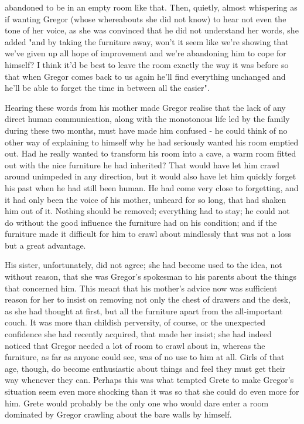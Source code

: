 \documentclass[12pt]{book}
\begin{document}
abandoned to be in an empty room like that. Then, quietly, almost whispering as if wanting Gregor (whose whereabouts she did not know) to hear not even the tone of her voice, as she was convinced that he did not understand her words, she added "and by taking the furniture away, won't it seem like we're showing that we've given up all hope of improvement and we're abandoning him to cope for himself? I think it'd be best to leave the room exactly the way it was before so that when Gregor comes back to us again he'll find everything unchanged and he'll be able to forget the time in between all the easier".

    Hearing these words from his mother made Gregor realise that the lack of any direct human communication, along with the monotonous life led by the family during these two months, must have made him confused - he could think of no other way of explaining to himself why he had seriously wanted his room emptied out. Had he really wanted to transform his room into a cave, a warm room fitted out with the nice furniture he had inherited? That would have let him crawl around unimpeded in any direction, but it would also have let him quickly forget his past when he had still been human. He had come very close to forgetting, and it had only been the voice of his mother, unheard for so long, that had shaken him out of it. Nothing should be removed; everything had to stay; he could not do without the good influence the furniture had on his condition; and if the furniture made it difficult for him to crawl about mindlessly that was not a loss but a great advantage.

    His sister, unfortunately, did not agree; she had become used to the idea, not without reason, that she was Gregor's spokesman to his parents about the things that concerned him. This meant that his mother's advice now was sufficient reason for her to insist on removing not only the chest of drawers and the desk, as she had thought at first, but all the furniture apart from the all-important couch. It was more than childish perversity, of course, or the unexpected confidence she had recently acquired, that made her insist; she had indeed noticed that Gregor needed a lot of room to crawl about in, whereas the furniture, as far as anyone could see, was of no use to him at all. Girls of that age, though, do become enthusiastic about things and feel they must get their way whenever they can. Perhaps this was what tempted Grete to make Gregor's situation seem even more shocking than it was so that she could do even more for him. Grete would probably be the only one who would dare enter a room dominated by Gregor crawling about the bare walls by himself.
\end{document}
